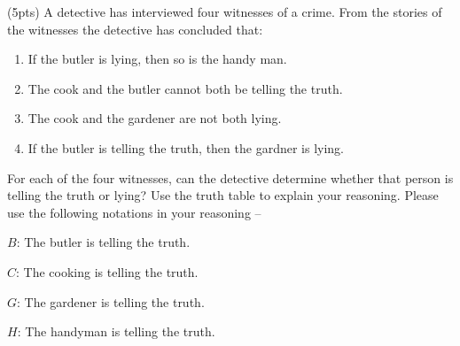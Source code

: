 \documentclass{article}
\newenvironment{Problem}
{\noindent\color{black}}
{\newline}
\begin{document}
\begin{Problem}
    (5pts) A detective has interviewed four witnesses of a crime. From the stories of the witnesses the detective has concluded that:
    \begin{enumerate}
        \item If the butler is lying, then so is the handy man.
        \item The cook and the butler cannot both be telling the truth.
        \item The cook and the gardener are not both lying.
        \item If the butler is telling the truth, then the gardner is lying. 
    \end{enumerate}

    For each of the four witnesses, can the detective determine whether that person is telling the truth or lying? Use the truth table to explain your reasoning. Please use the following notations in your reasoning –
    
    \begin{adjustwidth}{5em}{0em}
        $B$: The butler is telling the truth.

        $C$: The cooking is telling the truth.

        $G$: The gardener is telling the truth.

        $H$: The handyman is telling the truth.
    \end{adjustwidth}

    \phantom{ }
\end{Problem}
\end{document}
